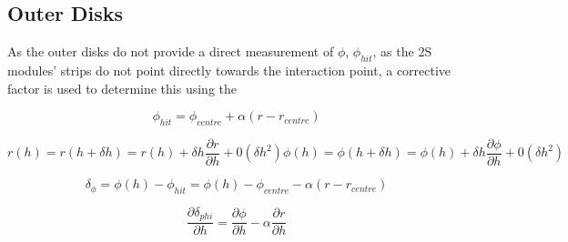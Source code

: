 \subsection{Outer Disks}
As the outer disks do not provide a direct measurement of $\phi$, $\phi_{hit}$, as the 2S modules' strips do not point directly towards the interaction point, a corrective factor is used to determine this using the 

\begin{equation}
\phi_{hit} = \phi_{centre} + \alpha ( r - r_{centre} )
\label{OuterHits1}
\end{equation}

\begin{equation}
r(h)  = r(h + \delta h) = r(h) + \delta h \frac{\partial r}{\partial h} + \mathcal{0} (\delta h^{2})
\phi(h)  = \phi(h + \delta h) = \phi(h) + \delta h \frac{\partial \phi}{\partial h} + \mathcal{0} (\delta h^{2})
\label{OuterHits2}
\end{equation}

\begin{equation}
\delta_{\phi} = \phi (h) - \phi_{hit} = \phi (h) - \phi_{centre} - \alpha ( r - r_{centre} )
\label{OuterHits3}
\end{equation}

\begin{equation}
\frac{\partial \delta_{phi}}{\partial h} = \frac{\partial \phi}{\partial h} - \alpha \frac{\partial r}{\partial h}
\label{OuterHits4}
\end{equation}
